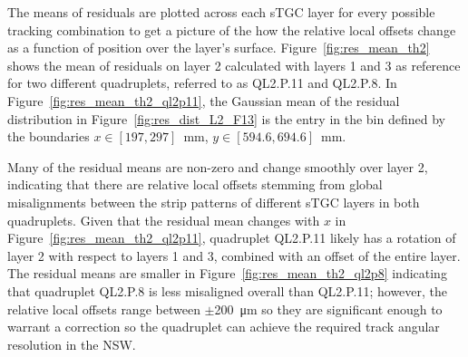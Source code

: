 The means of residuals are plotted across each sTGC layer for every possible tracking combination to get a picture of the how the relative local offsets change as a function of position over the layer's surface. Figure~\ref{fig:res_mean_th2} shows the mean of residuals on layer 2 calculated with layers 1 and 3 as reference for two different quadruplets, referred to as QL2.P.11 and QL2.P.8. In Figure~\ref{fig:res_mean_th2_ql2p11}, the Gaussian mean of the residual distribution in Figure~\ref{fig:res_dist_L2_F13} is the entry in the bin defined by the  boundaries $x\in\left[197, 297\right]$~mm,  $y\in\left[594.6, 694.6\right]$~mm.

Many of the residual means are non-zero and change smoothly over layer 2, indicating that there are relative local offsets stemming from global misalignments between the strip patterns of different sTGC layers in both quadruplets. Given that the residual mean changes with $x$ in Figure~\ref{fig:res_mean_th2_ql2p11}, quadruplet QL2.P.11 likely has a rotation of layer 2 with respect to layers 1 and 3, combined with an offset of the entire layer. The residual means are smaller in Figure~\ref{fig:res_mean_th2_ql2p8} indicating that quadruplet QL2.P.8 is less misaligned overall than QL2.P.11; however, the relative local offsets range between $\pm$\SI{200}{\micro\meter} so they are significant enough to warrant a correction so the quadruplet can achieve the required track angular resolution in the NSW.

